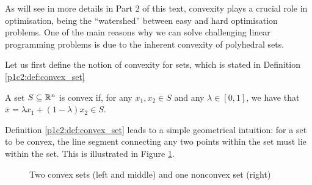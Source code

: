 As will see in more details in Part 2 of this text, convexity plays a crucial role in optimisation, being the ``watershed'' between easy and hard optimisation problems. One of the main reasons why we can solve challenging linear programming problems is due to the inherent convexity of polyhedral sets.

Let us first define the notion of convexity for sets, which is stated in Definition \ref{p1c2:def:convex_set} 

\begin{definition}\label{p1c2:def:convex_set} 
	A set $S \subseteq \mathbb{R}^n$ is convex if, for any $x_1,x_2 \in S$ and any $\lambda \in [0,1]$, we have that $\overline{x} = \lambda x_1 + (1-\lambda) x_2 \in S$.
\end{definition}

Definition \ref{p1c2:def:convex_set} leads to a simple geometrical intuition: for a set to be convex, the line segment connecting any two points within the set must lie within the set. This is illustrated in Figure \ref{p1c2:fig:convex_sets}.

\begin{figure}
	\caption{Two convex sets (left and middle) and one nonconvex set (right)} \label{p1c2:fig:convex_sets}
\end{figure}

